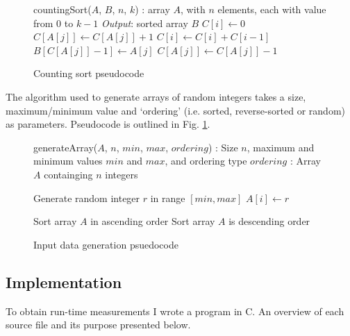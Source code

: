 \documentclass{article}
\begin{document}
\begin{figure}[H]
\begin{algorithmic}
 countingSort($A$, $B$, $n$, $k$)
: array $A$, with $n$ elements,
	each with value from $0$ to $k-1$
\STATE \emph{Output}: sorted array $B$
   \STATE $C[i] \leftarrow 0$
\ENDFOR
{}
   \STATE $C[A[j]] \leftarrow C[A[j]] + 1$
 \ENDFOR
   \STATE $C[i] \leftarrow C[i] + C[i-1]$
\ENDFOR
   \STATE $B[C[A[j]]-1] \leftarrow A[j]$
   \STATE $C[A[j]] \leftarrow C [A[j]] - 1$
\ENDFOR
\end{algorithmic}
\caption{Counting sort pseudocode}
\end{figure}

The algorithm used to generate arrays of random integers takes a size, maximum/minimum value and `ordering' (i.e. sorted, reverse-sorted or random) as parameters. Pseudocode is outlined in Fig. \ref{data-gen-alg}.

\begin{figure}[H]
\begin{algorithmic}
 generateArray($A$, $n$, $min$, $max$, $ordering$)
: Size $n$, maximum and minimum values $min$ and $max$, and ordering type $ordering$
: Array $A$ containging $n$ integers

	\STATE Generate random integer $r$ in range $[min, max]$
	\STATE $A[i] \leftarrow r$
\ENDFOR

	\STATE Sort array $A$ in ascending order
	\STATE Sort array $A$ is descending order
\ENDIF

\end{algorithmic}
\caption{Input data generation psuedocode}
\label{data-gen-alg}
\end{figure}

\subsection{Implementation}
To obtain run-time measurements I wrote a program in C. An overview of each source file and its purpose presented below.
\end{document}
